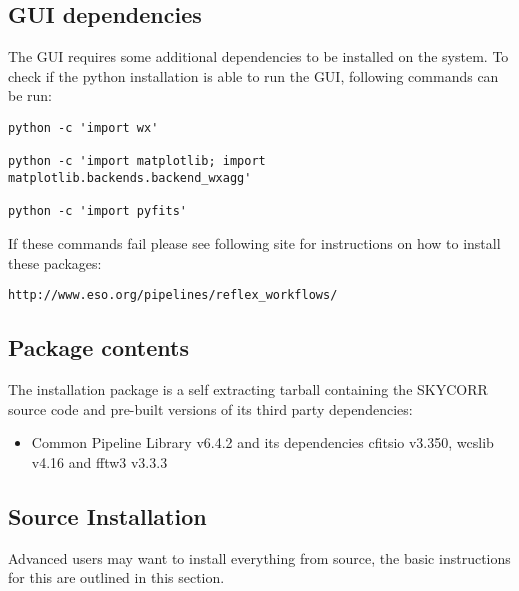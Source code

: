 \subsection{\ac{GUI} dependencies}
\label{sec:guidependencies}

The \ac{GUI} requires some additional dependencies to be installed on the system. To
check if the python installation is able to run the \ac{GUI}, following
commands can be run:

\begin{verbatim}
python -c 'import wx'

python -c 'import matplotlib; import matplotlib.backends.backend_wxagg'

python -c 'import pyfits'
\end{verbatim}

If these commands fail please see following site for instructions on how
to install these packages:

\texttt{http://www.eso.org/pipelines/reflex\_workflows/}

\subsection{Package contents}
\label{sec:pkgcontents}

The installation package is a self extracting tarball containing the
SKYCORR source code and pre-built versions of its third party dependencies:

\begin{itemize}
  \item
    Common Pipeline Library v6.4.2 and its dependencies cfitsio v3.350,
    wcslib v4.16 and fftw3 v3.3.3 \cite{CPL}
\end{itemize}


\subsection{Source Installation}
\label{sec:sourceinstall}

Advanced users may want to install everything from source, the
basic instructions for this are outlined in this section.

